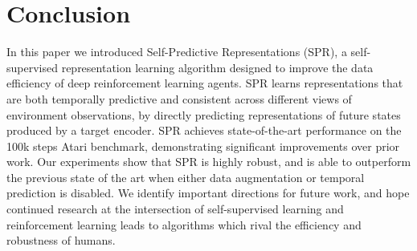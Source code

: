\section{Conclusion}
In this paper we introduced Self-Predictive Representations (SPR), a self-supervised representation learning algorithm designed to improve the data efficiency of deep reinforcement learning agents.
SPR learns representations that are both temporally predictive and consistent across different views of environment observations, by directly predicting representations of future states produced by a target encoder.
SPR achieves state-of-the-art performance on the 100k steps Atari benchmark, demonstrating significant improvements over prior work.
Our experiments show that SPR is highly robust, and is able to outperform the previous state of the art when either data augmentation or temporal prediction is disabled.
We identify important directions for future work, and hope continued research at the intersection of self-supervised learning and reinforcement learning leads to algorithms which rival the efficiency and robustness of humans.
